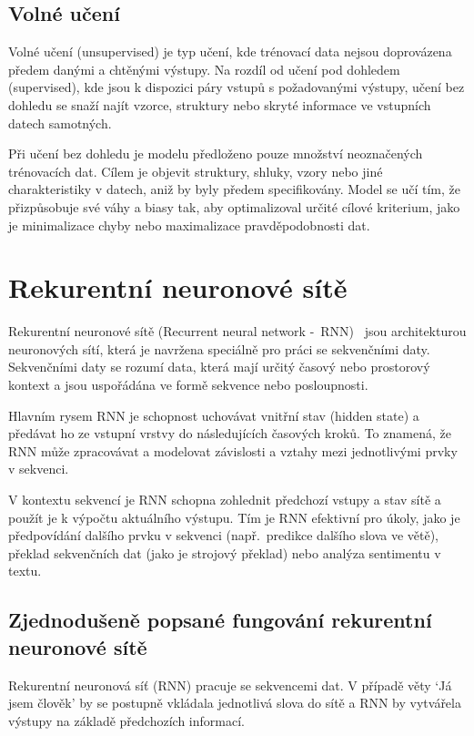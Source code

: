 \subsection{Volné učení}
Volné učení (unsupervised) je typ učení, kde trénovací data nejsou doprovázena předem danými a chtěnými výstupy.
Na rozdíl od učení pod dohledem (supervised), kde jsou k dispozici páry vstupů s požadovanými výstupy, učení bez dohledu se snaží najít vzorce, struktury nebo skryté informace ve vstupních datech samotných.

Při učení bez dohledu je modelu předloženo pouze množství neoznačených trénovacích dat.
Cílem je objevit struktury, shluky, vzory nebo jiné charakteristiky v datech, aniž by byly předem specifikovány.
Model se učí tím, že přizpůsobuje své váhy a biasy tak, aby optimalizoval určité cílové kriterium, jako je minimalizace chyby nebo maximalizace pravděpodobnosti dat.

\section{Rekurentní neuronové sítě}
Rekurentní neuronové sítě (Recurrent neural network -~RNN)~\cite{link16} jsou architekturou neuronových sítí, která je navržena speciálně pro práci se sekvenčními daty.
Sekvenčními daty se rozumí data, která mají určitý časový nebo prostorový kontext a jsou uspořádána ve formě sekvence nebo posloupnosti.

Hlavním rysem RNN je schopnost uchovávat vnitřní stav (hidden state) a předávat ho ze vstupní vrstvy do následujících časových kroků.
To znamená, že RNN může zpracovávat a modelovat závislosti a vztahy mezi jednotlivými prvky v sekvenci.

V kontextu sekvencí je RNN schopna zohlednit předchozí vstupy a stav sítě a použít je k výpočtu aktuálního výstupu.
Tím je RNN efektivní pro úkoly, jako je předpovídání dalšího prvku v sekvenci (např.\ predikce dalšího slova ve větě), překlad sekvenčních dat (jako je strojový překlad) nebo analýza sentimentu v textu.

\subsection{Zjednodušeně popsané fungování rekurentní neuronové sítě}
Rekurentní neuronová síť (RNN) pracuje se sekvencemi dat.
V případě věty `Já jsem člověk' by se postupně vkládala jednotlivá slova do sítě a RNN by vytvářela výstupy na základě předchozích informací.

